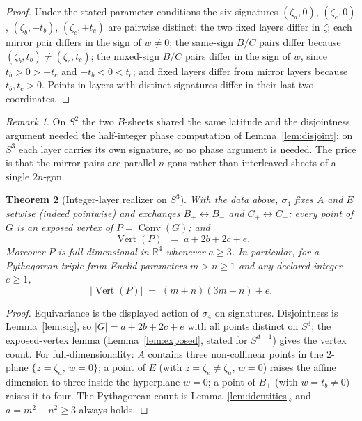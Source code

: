 \documentclass[11pt]{article}
\newtheorem{theorem}{Theorem}[section]
\theoremstyle{definition}
\theoremstyle{remark}
\newtheorem{remark}[theorem]{Remark}
\newcommand{\Vertset}{\operatorname{Vert}}
\newcommand{\Conv}{\operatorname{Conv}}
\begin{document}
\begin{proof}
Under the stated parameter conditions the six signatures
$(\zeta_a,0)$, $(\zeta_e,0)$, $(\zeta_b,\pm t_b)$, $(\zeta_c,\pm t_c)$ are
pairwise distinct: the two fixed layers differ in $\zeta$; each mirror
pair differs in the sign of $w\ne0$; the same-sign $B/C$ pairs differ
because $(\zeta_b,t_b)\ne(\zeta_c,t_c)$; the mixed-sign $B/C$ pairs differ
in the sign of $w$, since $t_b>0>-t_c$ and $-t_b<0<t_c$; and fixed layers
differ from mirror layers because $t_b,t_c>0$. Points in layers with
distinct signatures differ in their last two coordinates.
\end{proof}

\begin{remark}
On $S^2$ the two $B$-sheets shared the same latitude and the disjointness
argument needed the half-integer phase computation of
Lemma~\ref{lem:disjoint}; on $S^3$ each layer carries its own signature,
so no phase argument is needed. The price is that the mirror pairs are
parallel $n$-gons rather than interleaved sheets of a single $2n$-gon.
\end{remark}

\begin{theorem}[Integer-layer realizer on $S^3$]\label{thm:s3}
With the data above, $\sigma_4$ fixes $A$ and $E$ setwise (indeed
pointwise) and exchanges $B_+\leftrightarrow B_-$ and
$C_+\leftrightarrow C_-$; every point of $G$ is an exposed vertex of
$P=\Conv(G)$; and
\[
|\Vertset(P)| \;=\; a+2b+2c+e .
\]
Moreover $P$ is full-dimensional in $\mathbb R^4$ whenever $a\ge3$.
In particular, for a Pythagorean triple from Euclid parameters $m>n\ge1$
and any declared integer $e\ge1$,
\[
|\Vertset(P)| \;=\; (m+n)(3m+n)+e .
\]
\end{theorem}

\begin{proof}
Equivariance is the displayed action of $\sigma_4$ on signatures.
Disjointness is Lemma~\ref{lem:sig}, so $|G|=a+2b+2c+e$ with all points
distinct on $S^3$; the exposed-vertex lemma (Lemma~\ref{lem:exposed},
stated for $S^{d-1}$) gives the vertex count. For full-dimensionality:
$A$ contains three non-collinear points in the $2$-plane
$\{z=\zeta_a,\,w=0\}$; a point of $E$ (with $z=\zeta_e\ne\zeta_a$, $w=0$)
raises the affine dimension to three inside the hyperplane $w=0$; a point
of $B_+$ (with $w=t_b\ne0$) raises it to four. The Pythagorean count is
Lemma~\ref{lem:identities}, and $a=m^2-n^2\ge3$ always holds.
\end{proof}
\end{document}
